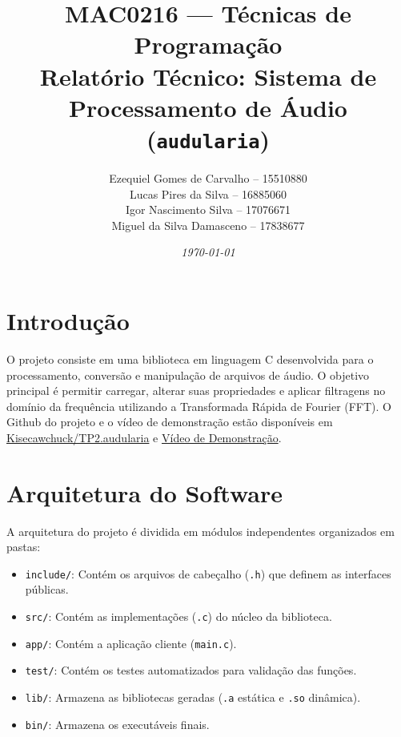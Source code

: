 \documentclass[12pt, a4paper]{article}
\title{MAC0216 --- Técnicas de Programação\\Relatório Técnico: Sistema de Processamento de Áudio (\texttt{audularia})}
\author{
    Ezequiel Gomes de Carvalho -- 15510880\\
    Lucas Pires da Silva -- 16885060\\
    Igor Nascimento Silva -- 17076671\\
    Miguel da Silva Damasceno -- 17838677
}
\date{\textit{\small{\today}}}
\begin{document}
\maketitle

\section{Introdução}
O projeto consiste em uma biblioteca em linguagem C desenvolvida para o processamento, conversão e manipulação de arquivos de áudio. O objetivo principal é permitir carregar, alterar suas propriedades  e aplicar filtragens no domínio da frequência utilizando a Transformada Rápida de Fourier (FFT). O Github do projeto e o vídeo de demonstração estão disponíveis em \href{https://github.com/Kisecawchuck/TP2.audularia}{Kisecawchuck/TP2.audularia} e \href{https://sortilegio.neocities.org/2026ii/MAC0216/}{Vídeo de Demonstração}.

\section{Arquitetura do Software}
A arquitetura do projeto é dividida em módulos independentes organizados em pastas:
\begin{itemize}
    \item \texttt{include/}: Contém os arquivos de cabeçalho (\texttt{.h}) que definem as interfaces públicas.
    \item \texttt{src/}: Contém as implementações (\texttt{.c}) do núcleo da biblioteca.
    \item \texttt{app/}: Contém a aplicação cliente (\texttt{main.c}).
    \item \texttt{test/}: Contém os testes automatizados para validação das funções.
    \item \texttt{lib/}: Armazena as bibliotecas geradas (\texttt{.a} estática e \texttt{.so} dinâmica).
    \item \texttt{bin/}: Armazena os executáveis finais.
\end{itemize}
\end{document}
